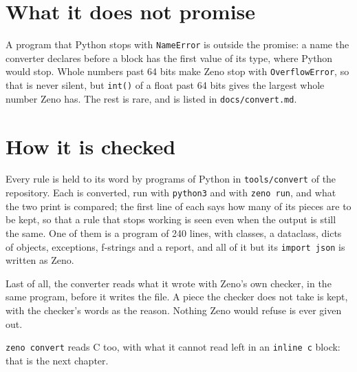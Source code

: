 \section{What it does not promise}

A program that Python stops with \verb|NameError| is outside the
promise: a name the converter declares before a block has the first
value of its type, where Python would stop. Whole numbers past 64 bits
make Zeno stop with \verb|OverflowError|, so that is never silent, but
\verb|int()| of a float past 64 bits gives the largest whole number
Zeno has. The rest is rare, and is listed in \verb|docs/convert.md|.

\section{How it is checked}

Every rule is held to its word by programs of Python in
\verb|tools/convert| of the repository. Each is converted, run with
\verb|python3| and with \verb|zeno run|, and what the two print is
compared; the first line of each says how many of its pieces are to be
kept, so that a rule that stops working is seen even when the output
is still the same. One of them is a program of 240 lines, with
classes, a dataclass, dicts of objects, exceptions, f-strings and a
report, and all of it but its \verb|import json| is written as Zeno.

Last of all, the converter reads what it wrote with Zeno's own
checker, in the same program, before it writes the file. A piece the
checker does not take is kept, with the checker's words as the reason.
Nothing Zeno would refuse is ever given out.

\begin{note}
\verb|zeno convert| reads C too, with what it cannot read left in an
\verb|inline c| block: that is the next chapter.
\end{note}
